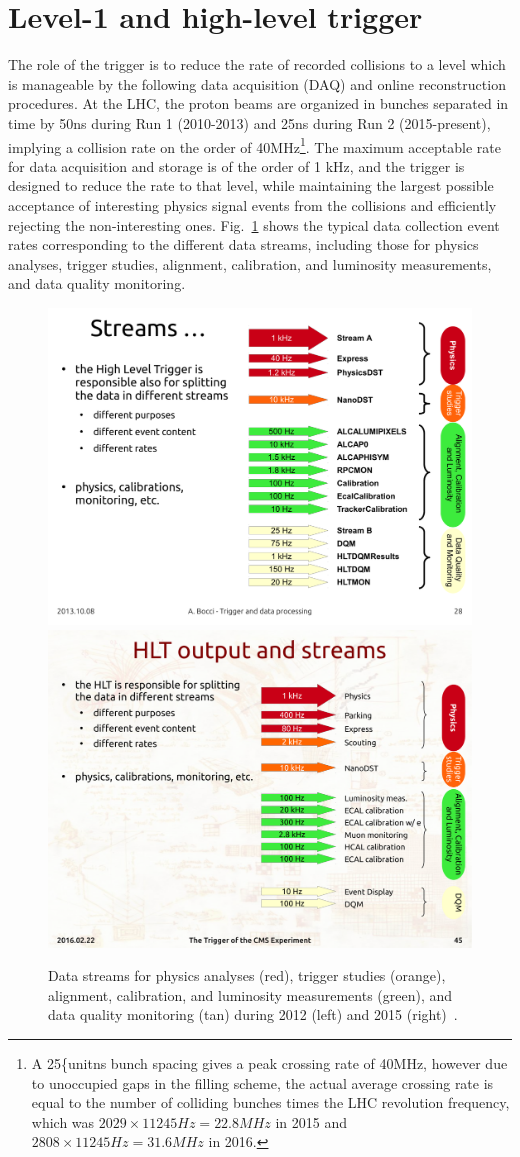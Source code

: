 \section {Level-1 and high-level trigger}
\label{sec:trigger}

The role of the trigger is to reduce the rate of recorded collisions to
a level which is manageable by the following data acquisition (DAQ)
and online reconstruction procedures. At the LHC, the proton beams are organized in
bunches separated in time by 50\unit{ns} during Run 1 (2010-2013) and 25\unit{ns}
during Run 2 (2015-present), implying a collision rate on the order of
40\unit{MHz}\footnote{A 25\{unit{ns} bunch spacing gives a peak
  crossing rate of 40\unit{MHz}, however due to unoccupied gaps in the filling
  scheme, the actual average crossing rate is equal to the number of
  colliding bunches times the LHC revolution frequency, which was
  $2029\times 11245\unit{Hz} = 22.8\unit{MHz}$ in 2015 and $2808 \times 11245\unit{Hz} = 31.6
  \unit{MHz}$ in 2016.}.
The maximum acceptable rate for data acquisition and storage is of the order of 1 \unit{kHz}, and
the trigger is designed to reduce the rate to that level, while
maintaining the largest possible acceptance of interesting physics signal
events from the collisions and efficiently rejecting the
non-interesting ones. Fig.~\ref{fig:streams} shows the typical
data collection event rates corresponding to the different data
streams, including those for physics analyses, trigger studies, alignment, calibration, and
luminosity measurements, and data quality monitoring. 

\begin{figure}\centering
\includegraphics[width=.45\textwidth]{figs/cms/Streams2012.pdf}
\includegraphics[width=.45\textwidth]{figs/cms/Streams2015.pdf}
\caption{Data streams for physics analyses (red), trigger studies (orange), alignment, calibration, and
luminosity measurements (green), and data quality monitoring (tan) during 2012 (left) and 2015 (right)~\cite{BocciTrigger}.  
\label{fig:streams}}
\end{figure}

